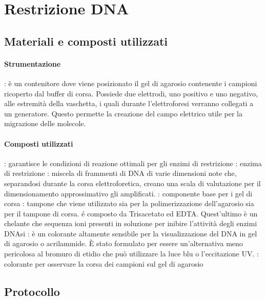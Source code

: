 \section{Restrizione DNA}
\subsection{Materiali e composti utilizzati}
\paragraph{Strumentazione}
\begin{itemize}[person]
	: è un contenitore dove viene posizionato il gel di agarosio contenente i campioni ricoperto dal buffer di corsa. Possiede due elettrodi, uno positivo e uno negativo, alle estremità della vaschetta, i quali durante l'elettroforesi verranno collegati a un generatore. Questo permette la creazione del campo elettrico utile per la migrazione delle molecole.
\end{itemize}

\paragraph{Composti utilizzati}
\begin{itemize}[person]
	\itemb[Buffer 10X]: garantisce le condizioni di reazione ottimali per gli enzimi di restrizione
	\itemb[DNA]
	: enzima di restrizione
	: miscela di frammenti di DNA di varie dimensioni note che, separandosi durante la corsa elettroforetica, creano una scala di valutazione per il dimensionamento approssimativo gli amplificati.
	\itemb[Agarosio]: componente base per i gel di corsa
	\itemb[TAE 50X]: tampone che viene utilizzato sia per la polimerizzazione dell'agarosio sia per il tampone di corsa. é composto da Trisacetato ed EDTA. Quest'ultimo è un chelante che sequenza ioni  presenti in soluzione per inibire l'attività degli enzimi DNAsi
	\itemb[SyberSafe]: è un colorante altamente sensibile per la visualizzazione del DNA in gel di agarosio o acrilammide. È stato formulato per essere un'alternativa meno pericolosa al bromuro di etidio che può utilizzare la luce blu o l'eccitazione UV.
	: colorante per osservare la corsa dei campioni sul gel di agarosio
\end{itemize}

\subsection{Protocollo}
